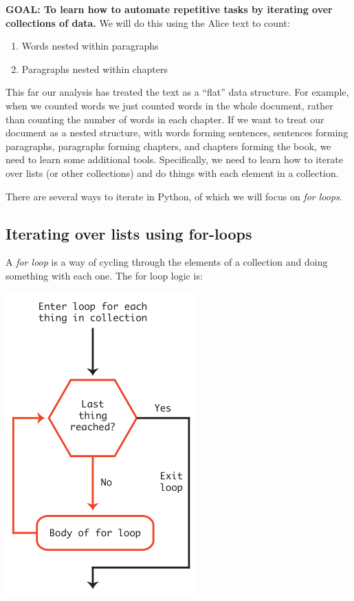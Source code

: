 \documentclass[]{book}
\providecommand{\tightlist}{%
  \setlength{\itemsep}{0pt}\setlength{\parskip}{0pt}}
\begin{document}
\textbf{GOAL: To learn how to automate repetitive tasks by iterating
over collections of data.} We will do this using the Alice text to
count:

\begin{enumerate}
\def\labelenumi{\arabic{enumi}.}
\tightlist
\item
  Words nested within paragraphs
\item
  Paragraphs nested within chapters
\end{enumerate}

This far our analysis has treated the text as a ``flat'' data structure.
For example, when we counted words we just counted words in the whole
document, rather than counting the number of words in each chapter. If
we want to treat our document as a nested structure, with words forming
sentences, sentences forming paragraphs, paragraphs forming chapters,
and chapters forming the book, we need to learn some additional tools.
Specifically, we need to learn how to iterate over lists (or other
collections) and do things with each element in a collection.

There are several ways to iterate in Python, of which we will focus on
\emph{for loops}.

\subsection{Iterating over lists using
for-loops}\label{iterating-over-lists-using-for-loops}

A \emph{for loop} is a way of cycling through the elements of a
collection and doing something with each one. The for loop logic is:

\includegraphics{Python/PythonIntro/images/for_loop_pic_small.png}
\end{document}
